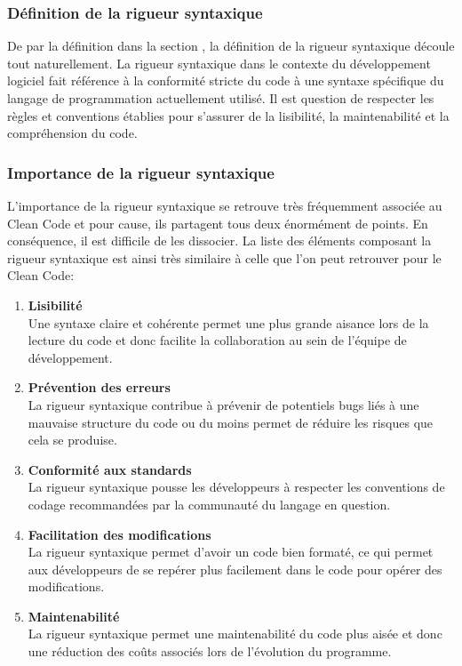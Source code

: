 \documentclass{rapport}
\begin{document}
\subsubsection{Définition de la rigueur syntaxique}
De par la définition dans la section , la définition de la rigueur syntaxique découle tout naturellement. La rigueur syntaxique dans le contexte du développement logiciel fait référence à la conformité stricte du code à une syntaxe spécifique du langage de programmation actuellement utilisé. Il est question de respecter les règles et conventions établies pour  s'assurer de la lisibilité, la maintenabilité et la compréhension du code.

\subsubsection{Importance de la rigueur syntaxique}
L'importance de la rigueur syntaxique se retrouve très fréquemment associée au Clean Code et pour cause, ils partagent tous deux énormément de points. En conséquence, il est difficile de les dissocier. La liste des éléments composant la rigueur syntaxique est ainsi très similaire à celle que l'on peut retrouver pour le Clean Code:

\begin{enumerate}[listparindent=0pt, parsep=0pt]
    \item \textbf{Lisibilité}\\
    Une syntaxe claire et cohérente permet une plus grande aisance lors de la lecture du code et donc facilite la collaboration au sein de l'équipe de développement.\\
    
    \item \textbf{Prévention des erreurs}\\
    La rigueur syntaxique contribue à prévenir de potentiels bugs liés à une mauvaise structure du code ou du moins permet de réduire les risques que cela se produise.\\

    \item \textbf{Conformité aux standards}\\
    La rigueur syntaxique pousse les développeurs à respecter les conventions de codage recommandées par la communauté du langage en question.\\

    \item \textbf{Facilitation des modifications}\\
    La rigueur syntaxique permet d'avoir un code bien formaté, ce qui permet aux développeurs de se repérer plus facilement dans le code pour opérer des modifications.\\

    \item \textbf{Maintenabilité}\\
    La rigueur syntaxique permet une maintenabilité du code plus aisée et donc une réduction des coûts associés lors de l'évolution du programme.

\end{enumerate}
\end{document}
